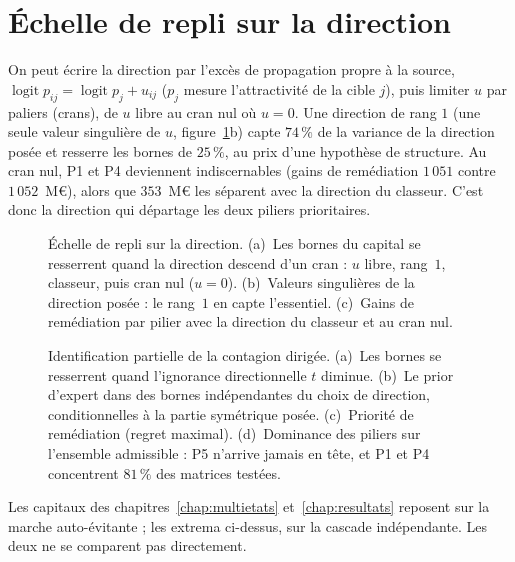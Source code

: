 \section{Échelle de repli sur la direction}
\label{sec:echelle-u}

On peut écrire la direction par l'excès de propagation propre à la source,
$\operatorname{logit}p_{ij}=\operatorname{logit}p_j+u_{ij}$ ($p_j$ mesure l'attractivité de la cible
$j$), puis limiter $u$ par paliers (crans), de $u$ libre au cran nul où $u=0$. Une direction de rang $1$ (une seule valeur singulière de $u$, figure~\ref{fig:echelle-repli}b) capte $74\,\%$ de la
variance de la direction posée et resserre les bornes de $25\,\%$, au prix d'une
hypothèse de structure. Au cran
nul, P1 et P4 deviennent indiscernables (gains de remédiation $1\,051$ contre $1\,052$~M\euro{}),
alors que $353$~M\euro{} les séparent avec la direction du classeur. C'est donc la direction qui
départage les deux piliers prioritaires.

\begin{figure}[H]\centering
{}
\caption{Échelle de repli sur la direction. (a)~Les bornes du capital se resserrent quand la
direction descend d'un cran : $u$ libre, rang~$1$, classeur, puis cran nul ($u=0$). (b)~Valeurs
singulières de la direction posée : le rang~$1$ en capte l'essentiel. (c)~Gains de remédiation par
pilier avec la direction du classeur et au cran nul.}
\label{fig:echelle-repli}
\end{figure}

\begin{figure}[H]
  \centering
  \caption{Identification partielle de la contagion dirigée. (a)~Les bornes se resserrent quand
l'ignorance directionnelle $t$ diminue. (b)~Le prior d'expert dans des bornes indépendantes du
choix de direction, conditionnelles à la partie symétrique posée. (c)~Priorité de remédiation (regret maximal). (d)~Dominance des
piliers sur l'ensemble admissible : P5 n'arrive jamais en tête, et P1 et P4 concentrent $81\,\%$ des
matrices testées.}
  \label{fig:partielle}
\end{figure}


Les capitaux des chapitres~\ref{chap:multietats} et~\ref{chap:resultats} reposent sur la marche auto-évitante ; les extrema ci-dessus, sur la cascade indépendante. Les deux ne se comparent pas directement.
